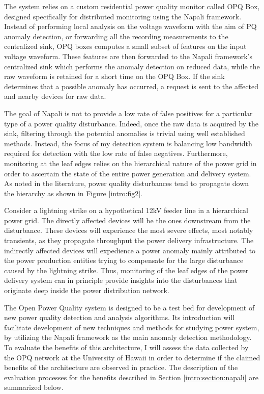 The system relies on a custom residential power quality monitor called OPQ Box, designed specifically for distributed monitoring using the Napali framework. Instead of performing local analysis on the voltage waveform with the aim of PQ anomaly detection, or forwarding all the recording measurements to the centralized sink, OPQ boxes computes a small subset of features on the input voltage waveform. These features are then forwarded to the Napali framework's centralized sink which performs the anomaly detection on reduced data, while the raw waveform is retained for a short time on the OPQ Box. If the sink determines that a possible anomaly has occurred, a request is sent to the affected and nearby devices for raw data.

The goal of Napali is not to provide a low rate of false positives for a particular type of a power quality disturbance. Indeed, once the raw data is acquired by the sink, filtering through the potential anomalies is trivial using well established methods. Instead, the focus of my detection system is balancing low bandwidth required for detection with the low rate of false negatives. Furthermore, monitoring at the leaf edges relies on the hierarchical nature of the power grid in order to ascertain the state of the entire power generation and delivery system. As noted in the literature, power quality disturbances tend to propagate down the hierarchy as shown in Figure \ref{intro:fig2}. 

Consider a lightning strike on a hypothetical 12kV feeder line in a hierarchical power grid. The directly affected devices will be the ones downstream from the disturbance. These devices will experience the most severe effects, most notably transients, as they propagate throughput the power delivery infrastructure. The indirectly affected devices will expedience a power anomaly mainly attributed to the power production entities trying to compensate for the large disturbance caused by the lightning strike. Thus, monitoring of the leaf edges of the power delivery system can in principle provide insights into the disturbances that originate deep inside the power distribution network.

The Open Power Quality system is designed to be a test bed for development of new power quality detection and analysis algorithms. Its introduction will facilitate development of new techniques and methods for studying power system, by utilizing the Napali framework as the main anomaly detection methodology. To evaluate the benefits of this architecture, I will assess the data collected by the OPQ network at the University of Hawaii in order to determine if the claimed benefits of the architecture are observed in practice. The description of the evaluation processes for the benefits described in Section \ref{intro:section:napali} are summarized below.

